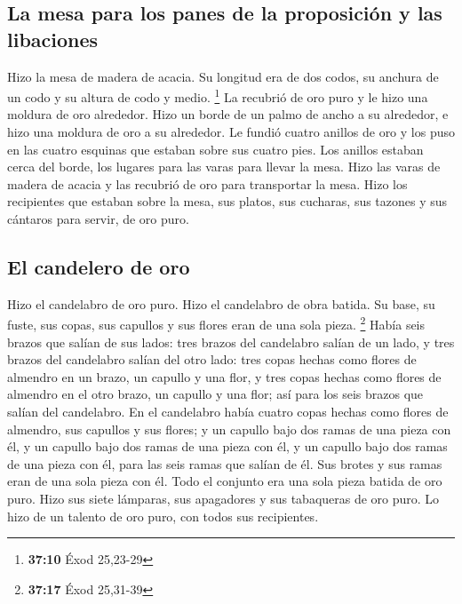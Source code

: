 \hypertarget{la-mesa-para-los-panes-de-la-proposiciuxf3n-y-las-libaciones}{%
\subsection{La mesa para los panes de la proposición y las
libaciones}\label{la-mesa-para-los-panes-de-la-proposiciuxf3n-y-las-libaciones}}

 Hizo la mesa de madera de acacia. Su longitud era de dos
codos, su anchura de un codo y su altura de codo y medio. \footnote{\textbf{37:10}
  Éxod 25,23-29}  La recubrió de oro puro y le hizo una
moldura de oro alrededor.  Hizo un borde de un palmo de
ancho a su alrededor, e hizo una moldura de oro a su alrededor.
 Le fundió cuatro anillos de oro y los puso en las cuatro
esquinas que estaban sobre sus cuatro pies.  Los anillos
estaban cerca del borde, los lugares para las varas para llevar la mesa.
 Hizo las varas de madera de acacia y las recubrió de oro
para transportar la mesa.  Hizo los recipientes que
estaban sobre la mesa, sus platos, sus cucharas, sus tazones y sus
cántaros para servir, de oro puro.

\hypertarget{el-candelero-de-oro}{%
\subsection{El candelero de oro}\label{el-candelero-de-oro}}

 Hizo el candelabro de oro puro. Hizo el candelabro de
obra batida. Su base, su fuste, sus copas, sus capullos y sus flores
eran de una sola pieza. \footnote{\textbf{37:17} Éxod 25,31-39}
 Había seis brazos que salían de sus lados: tres brazos
del candelabro salían de un lado, y tres brazos del candelabro salían
del otro lado:  tres copas hechas como flores de almendro
en un brazo, un capullo y una flor, y tres copas hechas como flores de
almendro en el otro brazo, un capullo y una flor; así para los seis
brazos que salían del candelabro.  En el candelabro había
cuatro copas hechas como flores de almendro, sus capullos y sus flores;
 y un capullo bajo dos ramas de una pieza con él, y un
capullo bajo dos ramas de una pieza con él, y un capullo bajo dos ramas
de una pieza con él, para las seis ramas que salían de él.
 Sus brotes y sus ramas eran de una sola pieza con él.
Todo el conjunto era una sola pieza batida de oro puro. 
Hizo sus siete lámparas, sus apagadores y sus tabaqueras de oro puro.
 Lo hizo de un talento de oro puro, con todos sus
recipientes.


